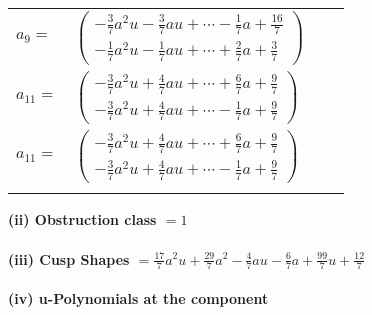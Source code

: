 \documentclass[1p]{elsarticle_modified}
\theoremstyle{definition}
\begin{document}
\begin{tabular}{m{7pt} m{180pt} m{7pt} m{180pt} }
\flushright $a_{9}=$&$\begin{pmatrix}-\frac{3}{7} a^2 u-\frac{3}{7} a u+\cdots-\frac{1}{7} a+\frac{16}{7}\\-\frac{1}{7} a^2 u-\frac{1}{7} a u+\cdots+\frac{2}{7} a+\frac{3}{7}\end{pmatrix}$ \\
\flushright $a_{11}=$&$\begin{pmatrix}-\frac{3}{7} a^2 u+\frac{4}{7} a u+\cdots+\frac{6}{7} a+\frac{9}{7}\\-\frac{3}{7} a^2 u+\frac{4}{7} a u+\cdots-\frac{1}{7} a+\frac{9}{7}\end{pmatrix}$\\ \flushright $a_{11}=$&$\begin{pmatrix}-\frac{3}{7} a^2 u+\frac{4}{7} a u+\cdots+\frac{6}{7} a+\frac{9}{7}\\-\frac{3}{7} a^2 u+\frac{4}{7} a u+\cdots-\frac{1}{7} a+\frac{9}{7}\end{pmatrix}$\\&\end{tabular}
\flushleft \textbf{(ii) Obstruction class $= 1$}\\~\\
\flushleft \textbf{(iii) Cusp Shapes $= \frac{17}{7} a^2 u+\frac{29}{7} a^2-\frac{4}{7} a u-\frac{6}{7} a+\frac{99}{7} u+\frac{12}{7}$}\\~\\
\newpage\renewcommand{\arraystretch}{1}
\flushleft \textbf{(iv) u-Polynomials at the component}\newline \\
\end{document}
